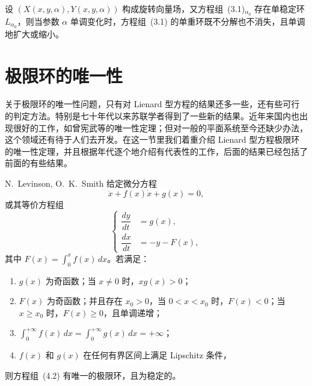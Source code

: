 \begin{theorem}{}{}
设 $(X(x,y,\alpha),Y(x,y,\alpha))$ 构成旋转向量场，又方程组~(3.1)$_{\alpha_0}$ 存在单稳定环 $L_{\alpha_0}$，则当参数 $\alpha$ 单调变化时，方程组~(3.1) 的单重环既不分解也不消失，且单调地扩大或缩小。
\end{theorem}

\section{极限环的唯一性}

关于极限环的唯一性问题，只有对 Lienard 型方程的结果还多一些，还有些可行的判定方法。特别是七十年代以来苏联学者得到了一些新的结果。近年来国内也出现很好的工作，如曾宪武等的唯一性定理；但对一般的平面系统至今还缺少办法，这个领域还有待于人们去开发。在这一节里我们着重介绍 Lienard 型方程极限环的唯一性定理，并且根据年代逐个地介绍有代表性的工作，后面的结果已经包括了前面的有些结果。

\begin{theorem}{N.~Levinson, O.~K.~Smith}{}
给定微分方程
\[
 \ddot{x}+f(x)\dot{x}+g(x)=0, \tag{4.1}
\]
或其等价方程组
\[
 \left\{
 \begin{aligned}
 \dfrac{dy}{dt}&=g(x),\\
 \dfrac{dx}{dt}&=-y-F(x),
 \end{aligned}\right. \tag{4.2}
\]
其中 $F(x)=\int_0^x f(x)\,dx$。若满足：

\begin{enumerate}
\item $g(x)$ 为奇函数；当 $x\ne0$ 时，$xg(x)>0$；
\item $F(x)$ 为奇函数；并且存在 $x_0>0$，当 $0<x<x_0$ 时，$F(x)<0$；当 $x\geq x_0$ 时，$F(x)\geq0$，且单调递增；
\item $\displaystyle\int_0^{+\infty}f(x)\,dx=\int_0^{+\infty}g(x)\,dx=+\infty$；
\item $f(x)$ 和 $g(x)$ 在任何有界区间上满足 Lipschitz 条件，
\end{enumerate}
则方程组~(4.2) 有唯一的极限环，且为稳定的。
\end{theorem}

